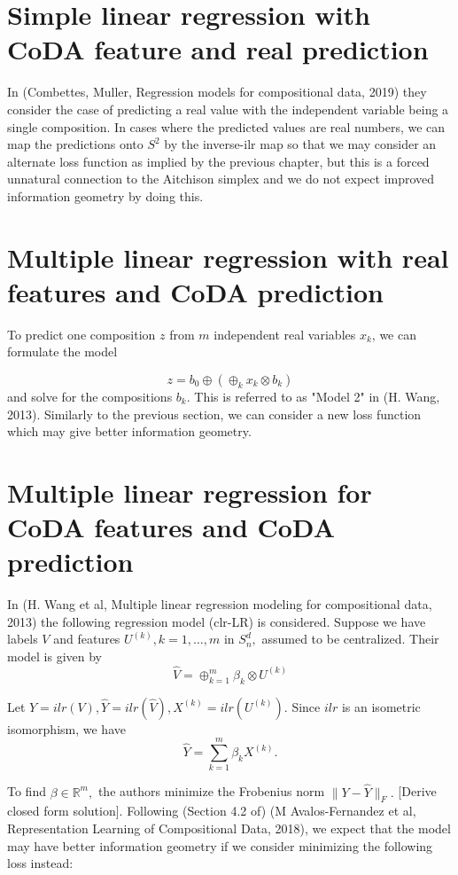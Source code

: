 \documentclass[BSc]{usydthesis}
\numberwithin{equation}{chapter}
\theoremstyle{remark}
\begin{document}
\section{Simple linear regression with CoDA feature and real prediction}
In (Combettes, Muller, Regression models for compositional data, 2019) they consider the case of predicting a real value with the independent variable being a single composition. In cases where the predicted values are real numbers, we can map the predictions onto $S^2$ by the inverse-ilr map so that we may consider an alternate loss function as implied by the previous chapter, but this is a forced unnatural connection to the Aitchison simplex and we do not expect improved information geometry by doing this. 

\section{Multiple linear regression with real features and CoDA prediction}
To predict one composition $z$ from $m$ independent real variables $x_k$, we can formulate the model 

$$ z = b_0 \oplus (\oplus_{k} x_k \otimes b_k)$$ and solve for the compositions $b_k.$ This is referred to as "Model 2" in (H. Wang, 2013). Similarly to the previous section, we can consider a new loss function which may give better information geometry.

\section{Multiple linear regression for CoDA features and CoDA prediction}
In (H. Wang et al, Multiple linear regression modeling for compositional data, 2013) the following regression model (clr-LR) is considered. Suppose we have labels $V$ and features $U^{(k)}, k=1,\ldots, m$ in $S^d_n,$ assumed to be centralized. Their model is given by $$ \hat{V} = \oplus_{k=1}^m \beta_k \otimes U^{(k)} $$

Let $Y = ilr(V), \hat{Y} = ilr(\hat{V}), X^{(k)} = ilr( U^{(k)} ).$  Since $ilr$ is an isometric isomorphism, we have $$ \hat{Y} = \sum_{k=1}^m \beta_k X^{(k)}.$$

To find $\beta \in \mathbb{R}^m,$ the authors minimize the Frobenius norm $ \| Y - \hat{Y} \|_F.$ [Derive closed form solution]. Following (Section 4.2 of) (M Avalos-Fernandez et al,  Representation Learning of Compositional Data, 2018), we expect that the model may have better information geometry if we consider minimizing the following loss instead:
\end{document}
